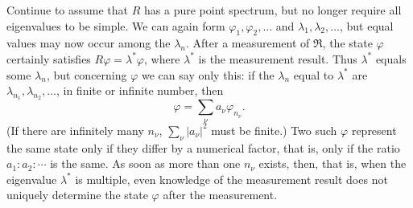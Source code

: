 \documentclass[fontsize=13pt,twoside,openany,headings=normal,parskip=false,bookmarkpackage=false,DIV=calc]{scrbook}
\begin{document}
Continue to assume that $R$ has a pure point spectrum, but no longer require all eigenvalues to be simple. We can again form $\varphi_1,\varphi_2,\ldots$ and $\lambda_1,\lambda_2,\ldots$, but equal values may now occur among the $\lambda_n$. After a measurement of $\mathfrak R$, the state $\varphi$ certainly satisfies $R\varphi=\lambda^*\varphi$, where $\lambda^*$ is the measurement result. Thus $\lambda^*$ equals some $\lambda_n$, but concerning $\varphi$ we can say only this: if the $\lambda_n$ equal to $\lambda^*$ are $\lambda_{n_1},\lambda_{n_2},\ldots$, in finite or infinite number, then
\[
\varphi=\sum_\nu a_\nu\varphi_{n_\nu}.
\]
(If there are infinitely many $n_\nu$, $\sum_\nu|a_\nu|^2$ must be finite.) Two such $\varphi$ represent the same state only if they differ by a numerical factor, that is, only if the ratio $a_1:a_2:\cdots$ is the same. As soon as more than one $n_\nu$ exists, then, that is, when the eigenvalue $\lambda^*$ is multiple, even knowledge of the measurement result does not uniquely determine the state $\varphi$ after the measurement.
\end{document}

